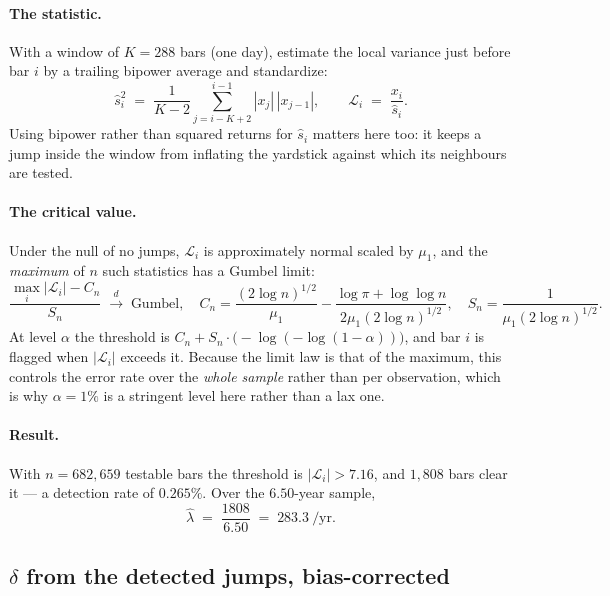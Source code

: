 \documentclass[11pt]{article}
\theoremstyle{definition}
\theoremstyle{remark}
\newcommand{\1}{\mathbf{1}}
\begin{document}
\paragraph{The statistic.} With a window of $K = 288$ bars (one day), estimate the local variance just before bar $i$ by a trailing bipower average and standardize:
\begin{equation}\label{eq:lm}
\hat s_i^2 \;=\; \frac{1}{K-2}\sum_{j=i-K+2}^{i-1} |x_j|\,|x_{j-1}|,
\qquad
\mathcal L_i \;=\; \frac{x_i}{\hat s_i}.
\end{equation}
Using bipower rather than squared returns for $\hat s_i$ matters here too: it keeps a jump inside the window from inflating the yardstick against which its neighbours are tested.

\paragraph{The critical value.} Under the null of no jumps, $\mathcal L_i$ is approximately normal scaled by $\mu_1$, and the \emph{maximum} of $n$ such statistics has a Gumbel limit:
\[
\frac{\max_i|\mathcal L_i| - C_n}{S_n} \;\xrightarrow{d}\; \text{Gumbel},
\quad
C_n = \frac{(2\log n)^{1/2}}{\mu_1} - \frac{\log\pi + \log\log n}{2\mu_1 (2\log n)^{1/2}},
\quad
S_n = \frac{1}{\mu_1 (2\log n)^{1/2}}.
\]
At level $\alpha$ the threshold is $C_n + S_n\cdot\big(-\log(-\log(1-\alpha))\big)$, and bar $i$ is flagged when $|\mathcal L_i|$ exceeds it. Because the limit law is that of the maximum, this controls the error rate over the \emph{whole sample} rather than per observation, which is why $\alpha = 1\%$ is a stringent level here rather than a lax one.

\paragraph{Result.} With $n = 682{,}659$ testable bars the threshold is $|\mathcal L_i| > 7.16$, and $1{,}808$ bars clear it --- a detection rate of $0.265\%$. Over the $6.50$-year sample,
\[
\hat\lambda \;=\; \frac{1808}{6.50} \;=\; \mathbf{283.3}\ \text{/yr}.
\]

\subsection{\texorpdfstring{$\delta$}{delta} from the detected jumps, bias-corrected}
\end{document}
